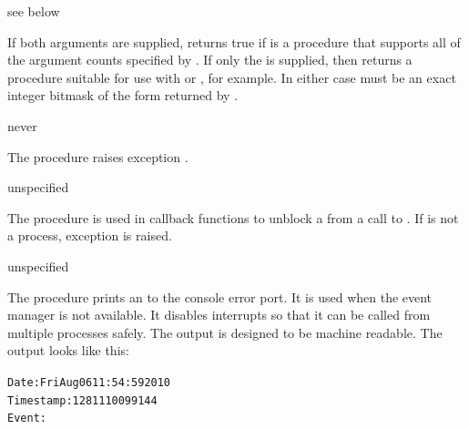 \begin{procedure}
\end{procedure}
\returns{} see below

If both arguments are supplied,  returns true if
 is a procedure that supports all of the argument counts specified by
.
If only the  is supplied, then 
returns a procedure 
suitable for use with  or , for example.
In either case  must be an exact integer bitmask of the
form returned by .

\begin{procedure}
\end{procedure}
\returns{} never

The  procedure raises exception .

\begin{procedure}
\end{procedure}
\returns{} unspecified

The  procedure is used in callback functions to
unblock a  from a call to . If
 is not a process, exception  is raised.

\begin{procedure}
\end{procedure}
\returns{} unspecified

The  procedure prints an  to
the console error port. It is used when the event manager is not
available. It disables interrupts so that it can be called from
multiple processes safely.  The output is designed to be machine
readable. The output looks like this:

\begin{alltt}
Date: Fri Aug 06 11:54:59 2010
Timestamp: 1281110099144
Event: 
\end{alltt}

